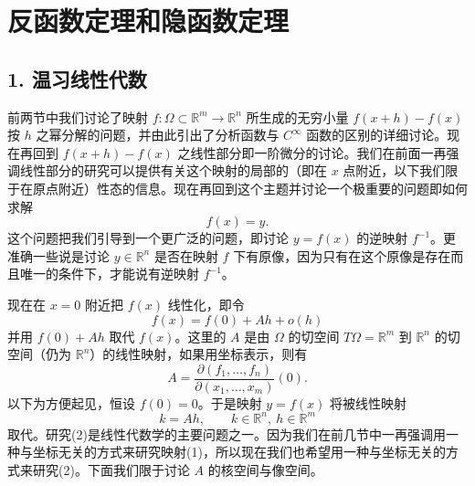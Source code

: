\section{反函数定理和隐函数定理}

\subsection*{1. 温习线性代数}

前两节中我们讨论了映射 $f:\Omega\subset\mathbb R^m\to\mathbb R^n$ 所生成的无穷小量 $f(x+h)-f(x)$ 按 $h$ 之幂分解的问题，并由此引出了分析函数与 $C^\infty$ 函数的区别的详细讨论。现在再回到 $f(x+h)-f(x)$ 之线性部分即一阶微分的讨论。我们在前面一再强调线性部分的研究可以提供有关这个映射的局部的（即在 $x$ 点附近，以下我们限于在原点附近）性态的信息。现在再回到这个主题并讨论一个极重要的问题即如何求解
\begin{equation}
 f(x)=y.
 \tag{1}
\end{equation}
这个问题把我们引导到一个更广泛的问题，即讨论 $y=f(x)$ 的逆映射 $f^{-1}$。更准确一些说是讨论 $y\in\mathbb R^n$ 是否在映射 $f$ 下有原像，因为只有在这个原像是存在而且唯一的条件下，才能说有逆映射 $f^{-1}$。

现在在 $x=0$ 附近把 $f(x)$ 线性化，即令
\[
 f(x)=f(0)+Ah+o(h)
\]
并用 $f(0)+Ah$ 取代 $f(x)$。这里的 $A$ 是由 $\Omega$ 的切空间 $T\Omega=\mathbb R^m$ 到 $\mathbb R^n$ 的切空间（仍为 $\mathbb R^n$）的线性映射，如果用坐标表示，则有
\[
 A=\frac{\partial(f_1,\ldots,f_n)}{\partial(x_1,\ldots,x_m)}(0).
\]
以下为方便起见，恒设 $f(0)=0$。于是映射 $y=f(x)$ 将被线性映射
\[
 k=Ah,
 \qquad k\in\mathbb R^n,\ h\in\mathbb R^m
 \tag{2}
\]
取代。研究(2)是线性代数学的主要问题之一。因为我们在前几节中一再强调用一种与坐标无关的方式来研究映射(1)，所以现在我们也希望用一种与坐标无关的方式来研究(2)。下面我们限于讨论 $A$ 的核空间与像空间。

